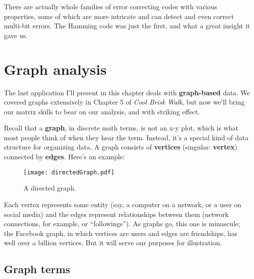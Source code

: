 \begin{alttitles}
There are actually whole families of error correcting codes with various
properties, some of which are more intricate and can detect and even correct
multi-bit errors. The Hamming code was just the first, and what a great insight
it gave us.



\pagebreak

\renewcommand{\thesubsection}{G\arabic{subsection}.}%
\section{Graph analysis}

\label{sec:graphs}

The last application I'll present in this chapter deals with
\textbf{graph-based} data. We covered graphs extensively in Chapter 5 of
\textit{Cool Brisk Walk}, but now we'll bring our matrix skills to bear on our
analysis, and with striking effect.


Recall that a \textbf{graph}, in discrete math terms, is not an x-y plot,
which is what most people think of when they hear the term. Instead, it's a
special kind of data structure for organizing data. A graph consists of
\textbf{vertices} (singular: \textbf{vertex}) connected by \textbf{edges}.
Here's an example:

\begin{figure}[ht]
\centering
\texttt{[image: directedGraph.pdf]}
\caption{A directed graph.}
\label{fig:directedGraph}
\end{figure}

Each vertex represents some entity (say, a computer on a network, or a user on
social media) and the edges represent relationships between them (network
connections, for example, or ``followings''). As graphs go, this one is
minuscule; the Facebook graph, in which vertices are users and edges are
friendships, has well over a billion vertices. But it will serve our purposes
for illustration.


\subsection{Graph terms}


\end{alttitles}
